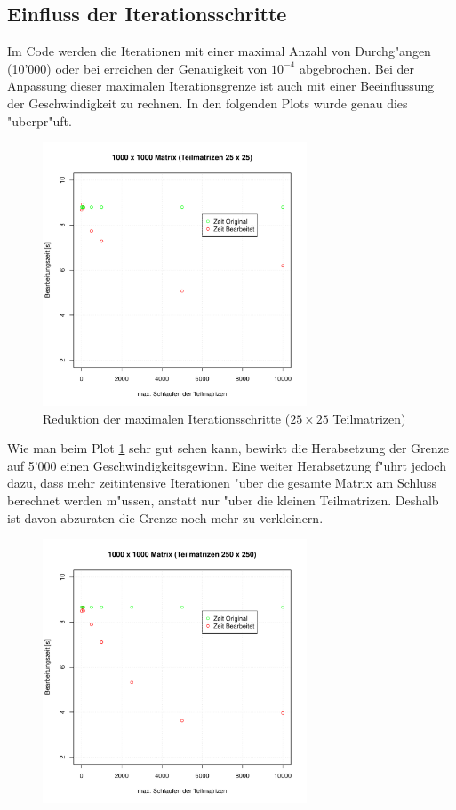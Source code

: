 \begin{refsection}
\subsection[Iterationsschritte]{Einfluss der Iterationsschritte}
Im Code werden die Iterationen mit einer maximal Anzahl von Durchg"angen (10'000) oder bei erreichen der Genauigkeit von $10^{-4}$ abgebrochen. Bei der Anpassung dieser maximalen Iterationsgrenze ist auch mit einer Beeinflussung der Geschwindigkeit zu rechnen. In den folgenden Plots wurde genau dies "uberpr"uft.
\begin{figure}[H]
\begin{center}
\includegraphics[width=0.7\textwidth]{./mapreduce/PC1000spec25.pdf}
\end{center}
\caption{Reduktion der maximalen Iterationsschritte ($25\times25$ Teilmatrizen)}
\label{w}
\end{figure}
Wie man beim Plot \ref{w} sehr gut sehen kann, bewirkt die Herabsetzung der Grenze auf 5'000 einen Geschwindigkeitsgewinn. Eine weiter Herabsetzung f"uhrt jedoch dazu, dass mehr zeitintensive Iterationen "uber die gesamte Matrix am Schluss berechnet werden m"ussen, anstatt nur "uber die kleinen Teilmatrizen. Deshalb ist davon abzuraten die Grenze noch mehr zu verkleinern.
\begin{figure}
\begin{center}
\includegraphics[width=0.7\textwidth]{./mapreduce/PC1000spec250.pdf}

\end{center}
\end{figure}
\end{refsection}
